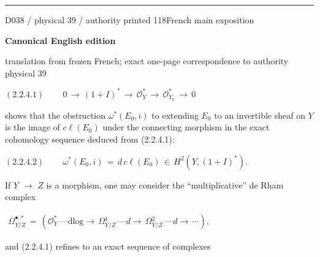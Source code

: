 \documentclass[9pt]{article}
\newcommand{\CanonText}[1]{\par{\fontsize{8.0}{9.35}\selectfont\RaggedRight #1\par}\vspace{2.2pt}}
\newcommand{\CanonDisplay}[1]{\par\vspace{1.2pt}\begin{center}{\fontsize{7.2}{8.4}\selectfont\(\displaystyle #1\)}\end{center}\vspace{1.2pt}}
\newenvironment{CanonMathBlock}{\par\vspace{1.2pt}\begin{center}\fontsize{6.8}{8.0}\selectfont\(\displaystyle}{\)\end{center}\vspace{1.2pt}}
\newcommand{\LayerTitle}{Canonical English edition}
\begin{document}
\begin{minipage}[t][\dimexpr\textheight-5pt\relax][t]{\textwidth}
\vfill
{\color{Accent}\hrule height 0.35pt}\vspace{3pt}
\end{minipage}
\newpage
\noindent\begin{minipage}[t][\dimexpr\textheight-5pt\relax][t]{\textwidth}
{\sffamily\fontsize{7.3}{8.2}\selectfont\color{Quiet} D038 / physical 39 / authority printed 118\hfill French main exposition}
\par{}\vspace{4.5pt}
{\sffamily\fontsize{10.4}{11.6}\selectfont\bfseries\color{Accent} \LayerTitle}
\par{\sffamily\fontsize{6.7}{7.7}\selectfont\color{Quiet} translation from frozen French; exact one-page correspondence to authority physical 39}
\vspace{5pt}
\CanonDisplay{(2.2.4.1)\qquad\,0\,\to{}\,(1+I)^{*}\,\to{}\,\mathcal{O}_{Y}^{*}\,\to{}\,\mathcal{O}_{Y_{0}}^{*}\,\to{}\,0}
\CanonText{shows that the obstruction \(\omega{}^{*}(E_{0},i)\) to extending \(E_{0}\) to an invertible sheaf on \(Y\) is the image of \(c\ell{}(E_{0})\) under the connecting morphism in the exact cohomology sequence deduced from (2.2.4.1):}
\CanonDisplay{(2.2.4.2)\qquad\,\omega{}^{*}(E_{0},i)\,=\,d\,c\ell{}(E_{0})\,\in{}\,H^{2}(Y,(1+I)^{*}).}
\CanonText{If \(Y\) \(\to{}\) \(Z\) is a morphism, one may consider the “multiplicative” de Rham complex}
\begin{CanonMathBlock}
\begin{array}{c}
\Omega{}^{\bullet{},*}_{Y/Z}\,=\,(\mathcal{O}_{Y}^{*}\,\text{---}\text{dlog}\to{}\,\Omega{}^{1}_{Y/Z}\,\text{---}d\to{}\,\Omega{}^{2}_{Y/Z}\,\text{---}d\to{}\,\cdots{}),
\end{array}
\end{CanonMathBlock}
\CanonText{and (2.2.4.1) refines to an exact sequence of complexes}

\end{minipage}
\end{document}
